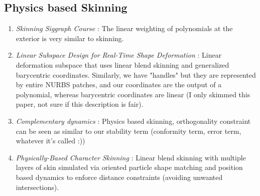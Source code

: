 \subsection{Physics based Skinning}
\begin{enumerate}
    \item \textit{Skinning Siggraph Course} \cite{10.1145/2614028.2615427}: The linear weighting of polynomials at the exterior is very similar to skinning.
    \item \textit{Linear Subspace Design for Real-Time Shape Deformation} \cite{10.1145/2766952}: Linear deformation subspace that uses linear blend skinning and generalized barycentric coordinates. Similarly, we have "handles" but they are represented by entire NURBS patches, and our coordinates are the output of a polynomial, whereas barycentric coordinates are linear (I only skimmed this paper, not sure if this description is fair).
    \item \textit{Complementary dynamics} \cite{Zhang_2020}: Physics based skinning, orthogonality constraint can be seen as similar to our stability term (conformity term, error term, whatever it's called :))
    \item \textit{Physically-Based Character Skinning} \cite{10.2312/PE.vriphys.vriphys13.025-034}: Linear blend skinning with multiple layers of skin simulated via oriented particle shape matching and position based dynamics to enforce distance constraints (avoiding unwanted intersections).
\end{enumerate}
